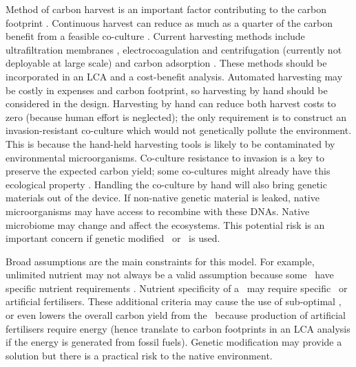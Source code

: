 \documentclass[../thesis.tex]{subfiles} %
\begin{document}
Method of carbon harvest is an important factor contributing to the carbon footprint \autocite{fuentes2016impact}.  Continuous harvest can reduce as much as a quarter of the carbon benefit from a feasible co-culture \autocite{mata2010microalgae}.  Current harvesting methods include ultrafiltration membranes \autocite{zhang2010harvesting}, electrocoagulation and centrifugation (currently not deployable at large scale) \autocite{wijffels2010outlook} and carbon adsorption \autocite{mata2010microalgae,wang2012novel,lee2014repeated}.  These methods should be incorporated in an LCA and a cost-benefit analysis.  Automated harvesting may be costly in expenses and carbon footprint, so harvesting by hand should be considered in the design.  Harvesting by hand can reduce both harvest costs to zero (because human effort is neglected); the only requirement is to construct an invasion-resistant co-culture which would not genetically pollute the environment.  This is because the hand-held harvesting tools is likely to be contaminated by environmental microorganisms.  Co-culture resistance to invasion is a key to preserve the expected carbon yield; some co-cultures might already have this ecological property \autocite{fuentes2016impact,seyedsayamdost2011roseobacticides}.  Handling the co-culture by hand will also bring genetic materials out of the device.  If non-native genetic material is leaked, native microorganisms may have access to recombine with these DNAs.  Native microbiome may change and affect the ecosystems.  This potential risk is an important concern if genetic modified \phy\ or \bac\ is used.

Broad assumptions are the main constraints for this model.  For example, unlimited nutrient may not always be a valid assumption because some \phy\ have specific nutrient requirements \autocite{kazamia2012mutualistic}.  Nutrient specificity of a \phy\ may require specific \bac\ or artificial fertilisers.  These additional criteria may cause the use of sub-optimal \bac, or even lowers the overall carbon yield from the \pbs\ because production of artificial fertilisers require energy (hence translate to carbon footprints in an LCA analysis if the energy is generated from fossil fuels).  Genetic modification may provide a solution but there is a practical risk to the native environment.
\end{document}
